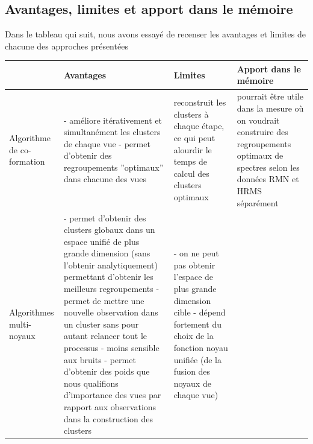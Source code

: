 \documentclass[12pt, french, latin.medieval, a4paper]{report}
\begin{document}
    	\subsection{Avantages, limites et apport dans le mémoire}
        	Dans le tableau qui suit, nous avons essayé de recenser les avantages et limites de chacune des approches présentées
        	\begin{center}
            	\begin{longtable}{|p{2.5cm}|p{4.5cm}|p{4.5cm}|p{3cm}|} \hline
                	~ & {Avantages} & {Limites} & {Apport dans le mémoire} \\
                    	\hline
                    	Algorithme de co-formation
                    	&
                    	{- améliore itérativement et simultanément les clusters de chaque vue} \newline\newline
                    	{- permet d’obtenir des regroupements ”optimaux” dans chacune des vues }
                    	&
                    	{ reconstruit les clusters à chaque étape, ce qui peut alourdir le temps de calcul des clusters optimaux}
                    	&
                    	{ pourrait être utile dans la mesure où on voudrait construire des regroupements optimaux de spectres selon les données RMN et HRMS séparément}
                    	\\
                    	\hline
                    	Algorithmes multi-noyaux
                    	&
                    	{- permet d'obtenir des clusters globaux dans un espace unifié de plus grande dimension (sans l'obtenir analytiquement) permettant d'obtenir les meilleurs regroupements } \newline\newline
                    	{- permet de mettre une nouvelle observation dans un cluster sans pour autant relancer tout le processus} \newline\newline
                    	{- moins sensible aux bruits} \newline\newline
                    	{- permet d’obtenir des poids que nous qualifions d'importance des vues par rapport aux observations dans la construction des clusters}
                    	&
                    	{- on ne peut pas obtenir l'espace de plus grande dimension cible} \newline\newline
                    	{- dépend fortement du choix de la fonction noyau unifiée (de la fusion des noyaux de chaque vue)}

\end{longtable}
\end{center}
\end{document}
